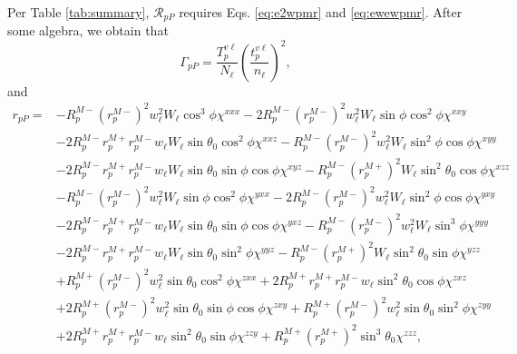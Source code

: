 Per Table \ref{tab:summary}, $\mathcal{R}_{pP}$ requires Eqs. \eqref{eq:e2wpmr} and \eqref{eq:ewewpmr}. After some algebra, we obtain that
\begin{equation}\label{mc78}
\Gamma_{pP} =
\frac{T^{v\ell}_{p}}{N_{\ell}}
\left(\frac{t^{v\ell}_{p}}{n_{\ell}}\right)^{2}
,
\end{equation}
and
\begin{equation}
\begin{split}
r_{pP}
=
&-R^{M-}_{p}\left(r^{M-}_{p}\right)^{2}w^{2}_{\ell}W_{\ell}\cos^{3}\phi
\chi^{xxx}
 -2R^{M-}_{p}\left(r^{M-}_{p}\right)^{2}w^{2}_{\ell}W_{\ell}\sin\phi\cos^{2}\phi
\chi^{xxy}\\
&-2R^{M-}_{p}r^{M+}_{p}r^{M-}_{p}w_{\ell}W_{\ell}\sin\theta_{0}\cos^{2}\phi
\chi^{xxz}
 -R^{M-}_{p}\left(r^{M-}_{p}\right)^{2}w^{2}_{\ell}W_{\ell}\sin^{2}\phi\cos\phi
\chi^{xyy}\\
&-2R^{M-}_{p}r^{M+}_{p}r^{M-}_{p}w_{\ell}W_{\ell}\sin\theta_{0}\sin\phi\cos\phi
\chi^{xyz}
 -R^{M-}_{p}\left(r^{M+}_{p}\right)^{2}W_{\ell}\sin^{2}\theta_{0}\cos\phi
\chi^{xzz}\\
&-R^{M-}_{p}\left(r^{M-}_{p}\right)^{2}w^{2}_{\ell}W_{\ell}\sin\phi\cos^{2}\phi
\chi^{yxx}
 -2R^{M-}_{p}\left(r^{M-}_{p}\right)^{2}w^{2}_{\ell}W_{\ell}\sin^{2}\phi\cos\phi
\chi^{yxy}\\
&-2R^{M-}_{p}r^{M+}_{p}r^{M-}_{p}w_{\ell}W_{\ell}\sin\theta_{0}\sin\phi\cos\phi
\chi^{yxz}
 -R^{M-}_{p}\left(r^{M-}_{p}\right)^{2}w^{2}_{\ell}W_{\ell}\sin^{3}\phi
\chi^{yyy}\\
&-2R^{M-}_{p}r^{M+}_{p}r^{M-}_{p}w_{\ell}W_{\ell}\sin\theta_{0}\sin^{2}\phi
\chi^{yyz}
 -R^{M-}_{p}\left(r^{M+}_{p}\right)^{2}W_{\ell}\sin^{2}\theta_{0}\sin\phi
\chi^{yzz}\\
&+R^{M+}_{p}\left(r^{M-}_{p}\right)^{2}w^{2}_{\ell}\sin\theta_{0}\cos^{2}\phi
\chi^{zxx}
 +2R^{M+}_{p}r^{M+}_{p}r^{M-}_{p}w_{\ell}\sin^{2}\theta_{0}\cos\phi
\chi^{zxz}\\
&+2R^{M+}_{p}\left(r^{M-}_{p}\right)^{2}w^{2}_{\ell}\sin\theta_{0}\sin\phi
\cos\phi\chi^{zxy}
 +R^{M+}_{p}\left(r^{M-}_{p}\right)^{2}w^{2}_{\ell}\sin\theta_{0}\sin^{2}\phi
\chi^{zyy}\\
&+2R^{M+}_{p}r^{M+}_{p}r^{M-}_{p}w_{\ell}\sin^{2}\theta_{0}\sin\phi
\chi^{zzy}
 +R^{M+}_{p}\left(r^{M+}_{p}\right)^{2}\sin^{3}\theta_{0}
\chi^{zzz}
,
\end{split}
\end{equation}
